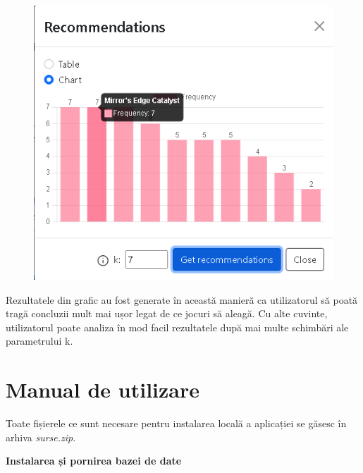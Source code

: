 \documentclass[12pt,a4paper]{report}
\begin{document}
\begin{figure}[H]
\centering
\caption{}
\begin{adjustbox}{max size={\textwidth}{\textheight}}
\includegraphics[scale=1]{exemplu_40_modal_4}
\end{adjustbox}
\caption*{}
\end{figure}

Rezultatele din grafic au fost generate în această manieră ca utilizatorul să poată tragă concluzii mult mai ușor legat de ce jocuri să aleagă. Cu alte cuvinte, utilizatorul poate analiza în mod facil rezultatele după mai multe schimbări ale parametrului k.


\section{Manual de utilizare}

Toate fișierele ce sunt necesare pentru instalarea locală a aplicației se găsesc în arhiva \emph{surse.zip}.

\newpage

\bigskip
\textbf{Instalarea și pornirea bazei de date}
\bigskip
\end{document}
